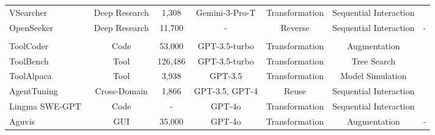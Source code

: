 \documentclass{llmxive}
\providecommand{\Filtering}{
  \begin{tikzpicture}[baseline=(char.base)]
    \fill[textgreen!50] (0,0) circle (0.18);
    \node[white, font=\scriptsize\rmfamily, inner sep=0pt] (char) at (0,0) {F};
  \end{tikzpicture}
}
\begin{document}
\begin{table}[!htbp]
{\begin{tabular}{lcccccc}
VSearcher~\cite{VSearcher}                             & Deep Research   & 1,308                 & Gemini-3-Pro-T                     & Transformation                                     & Sequential Interaction                              & \Filtering                                      \\
OpenSeeker~\cite{OpenSeeker}  & Deep Research   & 11,700  & - & Reverse & Sequential Interaction & - \\
\midrule
\rowcolor{gray!10!white} 
\multicolumn{7}{c}{\textbf{\textit{Trajectory Synthesis (\cref{sec:Trajectory_synthesis})}}} \\ 
ToolCoder~\cite{ToolCoder}                             & Code            & 53,000                  & GPT-3.5-turbo                              & Transformation                                     & Augmentation                                                 & \Filtering                                      \\
ToolBench~\cite{ToolBench}                               & Tool            & 126,486              & GPT-3.5-turbo                              & Transformation                                     & Tree Search                                & \Filtering                                      \\
ToolAlpaca~\cite{ToolAlpaca}  &  Tool   &  3,938 &  
GPT-3.5 & Transformation & Model Simulation& \Filtering \\
AgentTuning~\cite{AgentTuning}                           & Cross-Domain    & 1,866                & GPT-3.5, GPT-4                             & Reuse                                              & Sequential Interaction                              & \Filtering                                      \\
Lingma SWE-GPT~\cite{Lingma_SWE-GPT}                        & Code            & -                    & GPT-4o    & Transformation                                     & Sequential Interaction                              & \Filtering                                      \\
Aguvis~\cite{Aguvis}                                & GUI             & 35,000                & GPT-4o                                     & Transformation                                              &  Augmentation                                               & -                                              \\

\end{tabular}}
\end{table}
\end{document}
